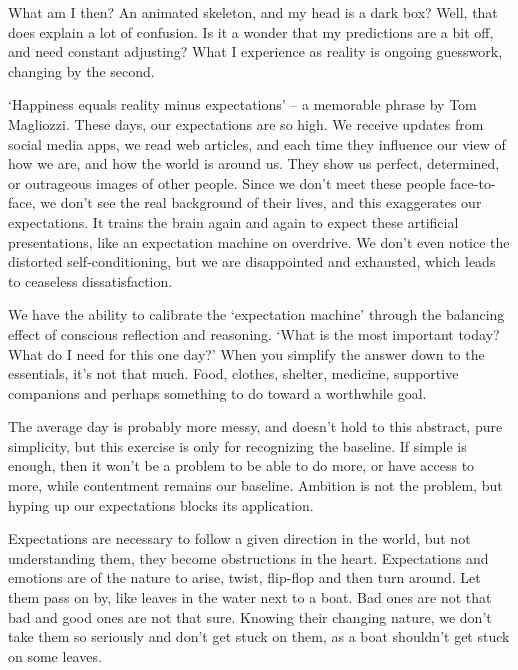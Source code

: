 What am I then? An animated skeleton, and my head is a dark box? Well,
that does explain a lot of confusion. Is it a wonder that my predictions
are a bit off, and need constant adjusting? What I experience as reality
is ongoing guesswork, changing by the second.

`Happiness equals reality minus expectations' -- a memorable phrase by
Tom Magliozzi. These days, our expectations are so high. We receive
updates from social media apps, we read web articles, and each time they
influence our view of how we are, and how the world is around us. They
show us perfect, determined, or outrageous images of other people. Since
we don't meet these people face-to-face, we don't see the real
background of their lives, and this exaggerates our expectations. It
trains the brain again and again to expect these artificial
presentations, like an expectation machine on overdrive. We don't even
notice the distorted self-conditioning, but we are disappointed and
exhausted, which leads to ceaseless dissatisfaction.


We have the ability to calibrate the `expectation machine' through the
balancing effect of conscious reflection and reasoning. `What is the
most important today? What do I need for this one day?' When you
simplify the answer down to the essentials, it's not that much. Food,
clothes, shelter, medicine, supportive companions and perhaps something
to do toward a worthwhile goal.

The average day is probably more messy, and doesn't hold to this
abstract, pure simplicity, but this exercise is only for recognizing the
baseline. If simple is enough, then it won't be a problem to be able to
do more, or have access to more, while contentment remains our baseline.
Ambition is not the problem, but hyping up our expectations blocks its
application.

Expectations are necessary to follow a given direction in the world, but
not understanding them, they become obstructions in the heart.
Expectations and emotions are of the nature to arise, twist, flip-flop
and then turn around. Let them pass on by, like leaves in the water next
to a boat. Bad ones are not that bad and good ones are not that sure.
Knowing their changing nature, we don't take them so seriously and don't
get stuck on them, as a boat shouldn't get stuck on some leaves.

